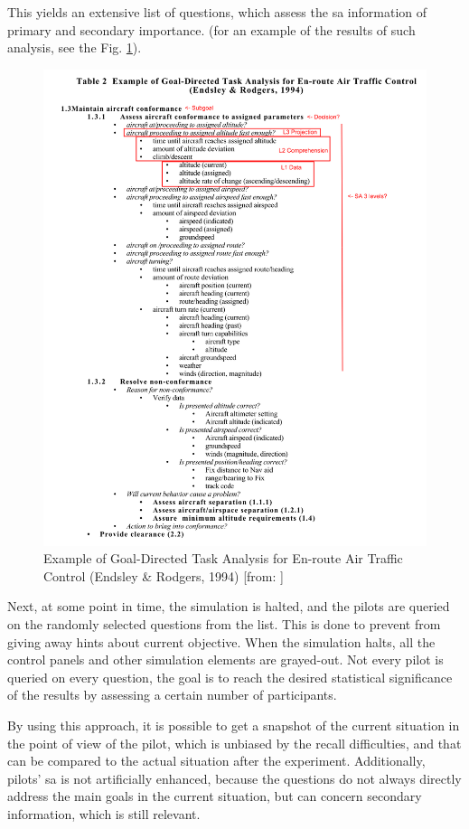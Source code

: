 This yields an extensive list of questions, which assess the \gls{sa} information of primary and secondary importance. (for an example of the results of such analysis, see the Fig. \ref{fig:sagoalorientedtaskanalysisresultexample}).

\begin{figure}
	\centering
	\includegraphics[width=0.7\linewidth]{figures/placeholders/SA_goal_oriented_task_analysis_result_example}
	\caption{Example of Goal-Directed Task Analysis for En-route Air Traffic Control (Endsley \& Rodgers, 1994) [from: \cite{endsley_direct_nodate}]}
	\label{fig:sagoalorientedtaskanalysisresultexample}
\end{figure}

Next, at some point in time, the simulation is halted, and the pilots are queried on the randomly selected questions from the list. This is done to prevent from giving away hints about current objective. When the simulation halts, all the control panels and other simulation elements are grayed-out. Not every pilot is queried on every question, the goal is to reach the desired statistical significance of the results by assessing a certain number of participants.

By using this approach, it is possible to get a snapshot of the current situation in the point of view of the pilot, which is unbiased by the recall difficulties, and that can be compared to the actual situation after the experiment. Additionally, pilots' \gls{sa} is not artificially enhanced, because the questions do not always directly address the main goals in the current situation, but can concern secondary information, which is still relevant.

